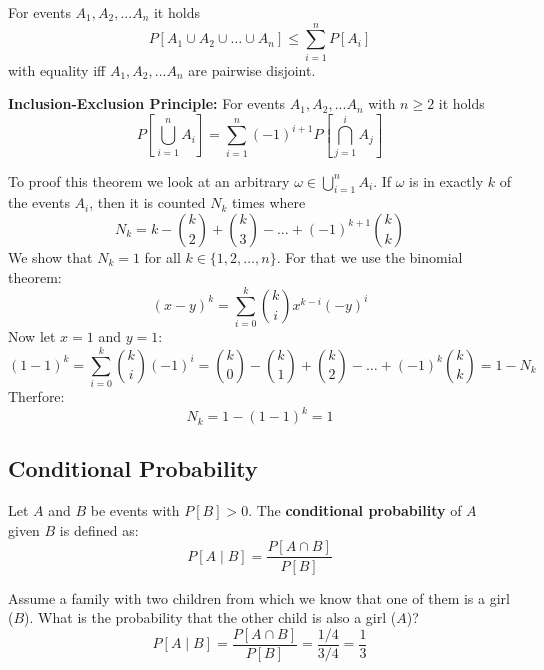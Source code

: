 \begin{theorem}

    For events $A_1, A_2, ... A_n$ it holds
    $$P[A_1 \cup A_2 \cup \dots \cup A_n] \leq \sum_{i=1}^n P[A_i]$$
    with equality iff $A_1, A_2, ... A_n$ are pairwise disjoint.
    
\end{theorem}

\begin{theorem}

\textbf{Inclusion-Exclusion Principle: } For events $A_1, A_2, ... A_n$ with $n \geq 2$ it holds
    $$P[\bigcup_{i=1}^n A_i] = \sum_{i=1}^n (-1)^{i+1} P[\bigcap_{j=1}^i A_j]$$
    
\end{theorem}

    To proof this theorem we look at an arbitrary $\omega \in \bigcup_{i=1}^n A_i$. If $\omega$ is in exactly
    $k$ of the events $A_i$, then it is counted $N_k$ times where
    $$N_k = k - \binom{k}{2} + \binom{k}{3} - \dots + (-1)^{k+1} \binom{k}{k}$$
    We show that $N_k = 1$ for all $k \in \{1, 2, \dots, n\}$. For that we use the binomial theorem:
    $$(x-y)^k = \sum_{i=0}^k \binom{k}{i} x^{k-i} (-y)^i$$
    Now let $x=1$ and $y=1$:
    $$(1-1)^k = \sum_{i=0}^k \binom{k}{i} (-1)^i = \binom{k}{0} - \binom{k}{1} + \binom{k}{2} - \dots + (-1)^k
    \binom{k}{k} = 1- N_k$$
    Therfore:
    $$N_k = 1 - (1-1)^k = 1$$

    \subsection{Conditional Probability}

\begin{definition}

    Let $A$ and $B$ be events with $P[B] > 0$. The \textbf{conditional probability} of $A$ given $B$ is
    defined as:
    $$P[A \mid B] = \frac{P[A \cap B]}{P[B]}$$
    
\end{definition}

\begin{example}

    Assume a family with two children from which we know that one of them is a girl ($B$). What is the
    probability that the other child is also a girl ($A$)?
    $$P[A \mid B] = \frac{P[A \cap B]}{P[B]} = \frac{1/4}{3/4} = \frac{1}{3}$$
    
\end{example}

